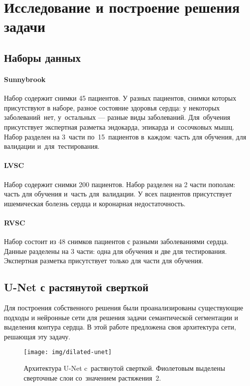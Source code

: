 \section{Исследование и построение решения задачи}

\subsection{Наборы данных}

\paragraph{Sunnybrook}

Набор содержит снимки 45 пациентов. У разных пациентов, 
снимки которых присутствуют в наборе, разное состояние здоровья сердца: 
у некоторых заболеваний~нет, у~остальных — разные виды заболеваний. 
Для~обучения присутствует экспертная разметка эндокарда, эпикарда 
и~сосочковых мышц. Набор разделен на 3~части по~15~пациентов 
в~каждом: часть для обучения, для валидации и~для~тестирования.

\paragraph{LVSC}

Набор содержит снимки 200 пациентов. Набор разделен на 2 части пополам: часть для обучения и~часть для~валидации. У всех пациентов присутствует ишемическая болезнь сердца и коронарная недостаточность.

\paragraph{RVSC}

Набор состоит из 48 снимков пациентов с разными заболеваниями сердца. Данные разделены на 3 части: одна для обучения и две для тестирования. Экспертная разметка присутствует только для части для обучения.

\subsection{U-Net с растянутой сверткой}

Для построения собственного решения были проанализированы существующие подходы и нейронные сети для решения задачи семантической сегментации и выделения контура сердца. В этой работе предложена своя архитектура сети, решающая эту задачу.

\begin{figure}[ht]
  \texttt{[image: img/dilated-unet]}
  \caption{Архитектура U-Net c~растянутой сверткой. Фиолетовым выделены сверточные слои со~значением растяжения~2.}
\end{figure}

